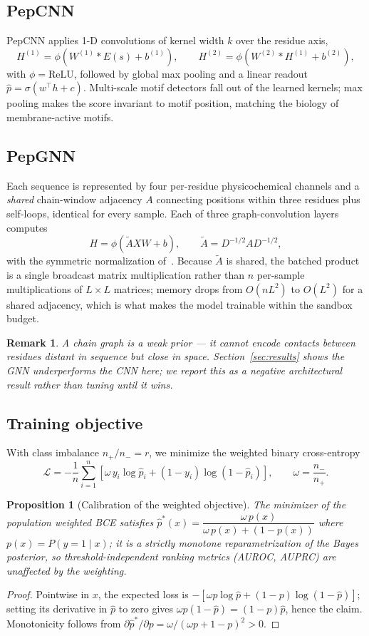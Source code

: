 \documentclass[12pt]{article}
\newtheorem{proposition}{Proposition}
\newtheorem{remark}{Remark}
\begin{document}
\subsection{PepCNN}
PepCNN applies 1-D convolutions of kernel width $k$ over the residue axis,
\[
H^{(1)} = \phi\!\left(W^{(1)} * E(s) + b^{(1)}\right),\qquad
H^{(2)} = \phi\!\left(W^{(2)} * H^{(1)} + b^{(2)}\right),
\]
with $\phi=\mathrm{ReLU}$, followed by global max pooling and a
linear readout $\hat p = \sigma(w^\top h + c)$. Multi-scale motif detectors
fall out of the learned kernels; max pooling makes the score invariant to
motif position, matching the biology of membrane-active motifs.

\subsection{PepGNN}
Each sequence is represented by four per-residue physicochemical channels
and a \emph{shared} chain-window adjacency $A$ connecting positions within
three residues plus self-loops, identical for every sample. Each of three
graph-convolution layers computes
\[
H = \phi\!\left(\tilde A X W + b\right),\qquad
\tilde A = D^{-1/2} A D^{-1/2},
\]
with the symmetric normalization of~\cite{kipf2017}. Because $\tilde A$ is
shared, the batched product is a single broadcast matrix multiplication
rather than $n$ per-sample multiplications of $L\times L$ matrices; memory
drops from $O(nL^2)$ to $O(L^2)$ for a shared adjacency, which is what makes the model
trainable within the sandbox budget.

\begin{remark}
A chain graph is a weak prior --- it cannot encode contacts between residues
distant in sequence but close in space. Section~\ref{sec:results} shows the
GNN underperforms the CNN here; we report this as a negative architectural
result rather than tuning until it wins.
\end{remark}

\subsection{Training objective}
With class imbalance $n_+/n_- = r$, we minimize the weighted binary
cross-entropy
\[
\mathcal{L} = -\frac{1}{n}\sum_{i=1}^{n}\left[
\omega\, y_i \log \hat p_i + (1-y_i)\log(1-\hat p_i)\right],
\qquad \omega = \frac{n_-}{n_+}.
\]
\begin{proposition}[Calibration of the weighted objective]
The minimizer of the population weighted BCE satisfies
$\hat p^\ast(x) = \dfrac{\omega\, p(x)}{\omega\, p(x) + (1-p(x))}$ where
$p(x)=P(y{=}1\mid x)$; it is a strictly monotone reparametrization of the
Bayes posterior, so threshold-independent ranking metrics (AUROC, AUPRC) are
unaffected by the weighting.
\end{proposition}
\begin{proof}
Pointwise in $x$, the expected loss is
$-[\omega p \log \hat p + (1-p)\log(1-\hat p)]$; setting its derivative in
$\hat p$ to zero gives $\omega p (1-\hat p) = (1-p)\hat p$, hence the claim.
Monotonicity follows from
$\partial \hat p^\ast/\partial p = \omega/(\omega p + 1 - p)^2 > 0$.
\end{proof}
\end{document}
